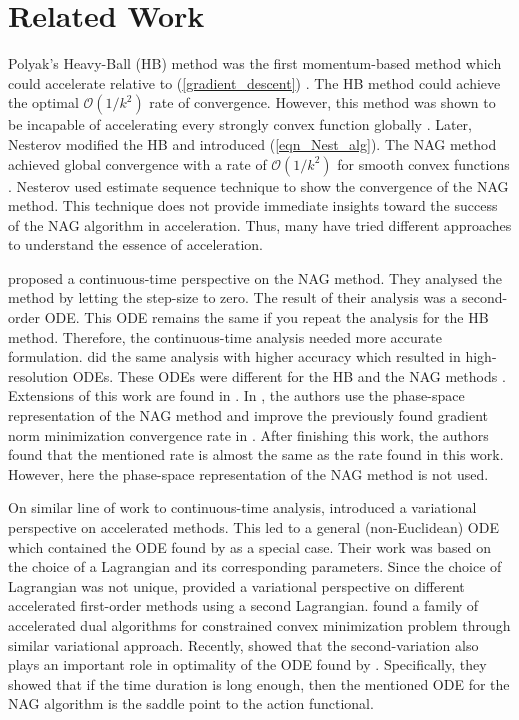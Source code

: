 \documentclass{article}
\theoremstyle{plain}
\theoremstyle{definition}
\theoremstyle{remark}
\begin{document}
\section{Related Work}\label{sec_relwork}
Polyak's Heavy-Ball (HB) method was the first momentum-based method which could accelerate relative to (\ref{gradient_descent}) \cite{Polyak1963GradientMF}. The HB method could achieve the optimal $\mathcal{O}(1/k^2)$ rate of convergence. However, this method was shown to be incapable of accelerating every strongly convex function globally \cite{Lessard2016AnalysisAD}. Later, Nesterov modified the HB and introduced (\ref{eqn_Nest_alg}). The NAG method achieved global convergence with a rate of $\mathcal{O}(1/k^2)$ for smooth convex functions \cite{Nesterov1983AMF}. Nesterov used estimate sequence technique to show the convergence of the NAG method. This technique does not provide immediate insights toward the success of the NAG algorithm in acceleration. Thus, many have tried different approaches to understand the essence of acceleration. \par
\cite{JMLR:v17:15-084} proposed a continuous-time perspective on the NAG method. They analysed the method by letting the step-size to zero. The result of their analysis was a second-order ODE. This ODE remains the same if you repeat the analysis for the HB method. Therefore, the continuous-time analysis needed more accurate formulation. \cite{Shi2021UnderstandingTA} did the same analysis with higher accuracy which resulted in high-resolution ODEs. These ODEs were different for the HB and the NAG methods \cite{shi2019acceleration}. Extensions of this work are found in \cite{chen2022gradient,chen2022accelerating}. In \cite{chen2022gradient}, the authors use the phase-space representation of the NAG method and improve the previously found gradient norm minimization convergence rate in \cite{Shi2021UnderstandingTA}. After finishing this work, the authors found that the mentioned rate is almost the same as the rate found in this work. However, here the phase-space representation of the NAG method is not used. \par 
On similar line of work to continuous-time analysis, \cite{WibisonoE7351} introduced a variational perspective on accelerated methods. This led to a general (non-Euclidean) ODE which contained the ODE found by \cite{JMLR:v17:15-084} as a special case. Their work was based on the choice of a Lagrangian and its corresponding parameters. Since the choice of Lagrangian was not unique, \cite{wilson2021lyapunov} provided a variational perspective on different accelerated first-order methods using a second Lagrangian. \cite{7963773} found a family of accelerated dual algorithms for constrained convex minimization problem through similar variational approach. Recently, \cite{zhang2021rethinking} showed that the second-variation also plays an important role in optimality of the ODE found by \cite{JMLR:v17:15-084}. Specifically, they showed that if the time duration is long enough, then the mentioned ODE for the NAG algorithm is the saddle point to the action functional. \par
\end{document}
